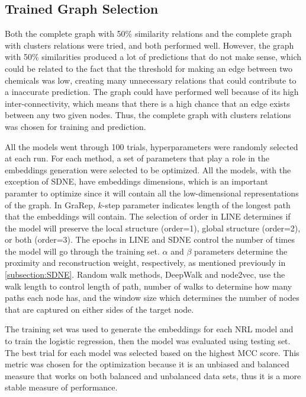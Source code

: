 \subsection{Trained Graph Selection}
Both the complete graph with 50\% similarity relations and the complete graph with clusters relations were tried, and both performed well. However, the graph with 50\% similarities produced a lot of predictions that do not make sense, which could be related to the fact that the threshold for making an edge between two chemicals was low, creating many unnecessary relations that could contribute to a inaccurate prediction. The graph could have performed well because of its high inter-connectivity, which means that there is a high chance that an edge exists between any two given nodes. Thus, the complete graph with clusters relations was chosen for training and prediction.

All the models went through 100 trials, hyperparameters were randomly selected at each run. For each method, a set of parameters that play a role in the embeddings generation were selected to be optimized. All the models, with the exception of SDNE, have embeddings dimensions, which is an important paramter to optimize since it will contain all the low-dimensional representations of the graph. In GraRep, $k$-step parameter indicates length of the longest path that the embeddings will contain. The selection of order in \ac{LINE} determines if the model will preserve the local structure (order=1), global structure (order=2), or both (order=3). The epochs in \ac{LINE} and \ac{SDNE} control the number of times the model will go through the training set. $\alpha$ and $\beta$ parameters determine the proximity and reconstruction weight, respectively, as mentioned previously in \ref{subsection:SDNE}. Random walk methods, DeepWalk and node2vec, use the walk length to control length of path, number of walks to determine how many paths each node has, and the window size which determines the number of nodes that are captured on either sides of the target node.

The training set was used to generate the embeddings for each \ac{NRL} model and to train the logistic regression, then the model was evaluated using testing set. The best trial for each model was selected based on the highest \ac{MCC} score. This metric was chosen for the optimization because it is an unbiased and balanced measure that works on both balanced and unbalanced data sets, thus it is a more stable measure of performance.

